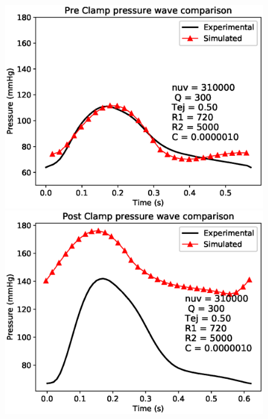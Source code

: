 \documentclass{config}
\begin{document}
\begin{figure}[H]
\begin{minipage}{0.48 \textwidth}
\centering
\includegraphics[scale=0.52]{Figures/Best_pre_clamp.eps}
\end{minipage}
\begin{minipage}{0.48 \textwidth}
\includegraphics[scale=0.52]{Figures/postclamp_pre.eps}
\end{minipage}


\end{figure}
\end{document}
